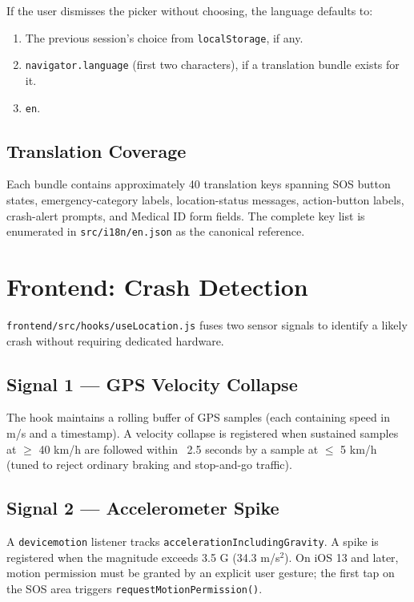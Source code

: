 \documentclass[11pt, a4paper]{article}
\newcommand{\file}[1]{\texttt{\small\color{rsblue}#1}}
\newcommand{\code}[1]{\texttt{\small#1}}
\begin{document}
If the user dismisses the picker without choosing, the language defaults to:

\begin{enumerate}[leftmargin=*, itemsep=2pt, topsep=2pt]
  \item The previous session's choice from \code{localStorage}, if any.
  \item \code{navigator.language} (first two characters), if a translation bundle exists for it.
  \item \code{en}.
\end{enumerate}

\subsection{Translation Coverage}

Each bundle contains approximately 40 translation keys spanning SOS button states, emergency-category labels, location-status messages, action-button labels, crash-alert prompts, and Medical ID form fields. The complete key list is enumerated in \file{src/i18n/en.json} as the canonical reference.

\section{Frontend: Crash Detection}

\file{frontend/src/hooks/useLocation.js} fuses two sensor signals to identify a likely crash without requiring dedicated hardware.

\subsection{Signal 1 --- GPS Velocity Collapse}

The hook maintains a rolling buffer of GPS samples (each containing speed in m/s and a timestamp). A velocity collapse is registered when sustained samples at $\ge$ 40 km/h are followed within ~2.5 seconds by a sample at $\le$ 5 km/h (tuned to reject ordinary braking and stop-and-go traffic).

\subsection{Signal 2 --- Accelerometer Spike}

A \code{devicemotion} listener tracks \code{accelerationIncludingGravity}. A spike is registered when the magnitude exceeds 3.5 G (34.3 m/s$^2$). On iOS 13 and later, motion permission must be granted by an explicit user gesture; the first tap on the SOS area triggers \code{requestMotionPermission()}.
\end{document}
